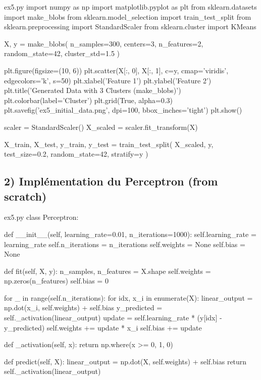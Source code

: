 \documentclass[12pt,a4paper]{article}
\begin{document}
\begin{codeholder}{ex5.py}
import numpy as np
import matplotlib.pyplot as plt
from sklearn.datasets import make_blobs
from sklearn.model_selection import train_test_split
from sklearn.preprocessing import StandardScaler
from sklearn.cluster import KMeans

X, y = make_blobs(
    n_samples=300,
    centers=3,
    n_features=2,
    random_state=42,
    cluster_std=1.5
)

plt.figure(figsize=(10, 6))
plt.scatter(X[:, 0], X[:, 1], c=y, cmap='viridis', edgecolors='k', s=50)
plt.xlabel('Feature 1')
plt.ylabel('Feature 2')
plt.title('Generated Data with 3 Clusters (make_blobs)')
plt.colorbar(label='Cluster')
plt.grid(True, alpha=0.3)
plt.savefig('ex5_initial_data.png', dpi=100, bbox_inches='tight')
plt.show()

scaler   = StandardScaler()
X_scaled = scaler.fit_transform(X)

X_train, X_test, y_train, y_test = train_test_split(
    X_scaled, y, test_size=0.2, random_state=42, stratify=y
)
\end{codeholder}


\subsection*{2) Implémentation du Perceptron (from scratch)}

\begin{codeholder}{ex5.py}
class Perceptron:

    def __init__(self, learning_rate=0.01, n_iterations=1000):
        self.learning_rate = learning_rate
        self.n_iterations  = n_iterations
        self.weights       = None
        self.bias          = None

    def fit(self, X, y):
        n_samples, n_features = X.shape
        self.weights = np.zeros(n_features)
        self.bias    = 0

        for _ in range(self.n_iterations):
            for idx, x_i in enumerate(X):
                linear_output = np.dot(x_i, self.weights) + self.bias
                y_predicted   = self._activation(linear_output)
                update        = self.learning_rate * (y[idx] - y_predicted)
                self.weights += update * x_i
                self.bias    += update

    def _activation(self, x):
        return np.where(x >= 0, 1, 0)

    def predict(self, X):
        linear_output = np.dot(X, self.weights) + self.bias
        return self._activation(linear_output)
\end{codeholder}
\end{document}
